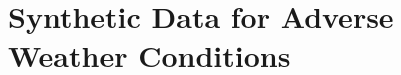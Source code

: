 \documentclass[report.tex]{subfiles}
\begin{document}
    
    \section{Synthetic Data for Adverse Weather Conditions}
\end{document}
